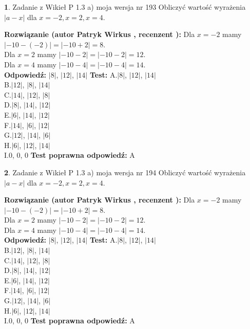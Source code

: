 \documentclass[12pt, a4paper]{article}
\theoremstyle{definition} %
\newtheorem{zad}{}
\newcommand{\zadStart}[1]{\begin{zad}#1\newline}
\newcommand{\zadStop}{\end{zad}}
\newcommand{\rozwStart}[2]{\noindent \textbf{Rozwiązanie (autor #1 , recenzent #2): }\newline}
\newcommand{\rozwStop}{\newline}
\newcommand{\odpStart}{\noindent \textbf{Odpowiedź:}\newline}
\newcommand{\odpStop}{\newline}
\newcommand{\testStart}{\noindent \textbf{Test:}\newline}
\newcommand{\testStop}{\newline}
\newcommand{\kluczStart}{\noindent \textbf{Test poprawna odpowiedź:}\newline}
\newcommand{\kluczStop}{\newline}
\begin{document}
\zadStart{Zadanie z Wikieł P 1.3 a) moja wersja nr 193}
Obliczyć wartość wyrażenia $|a - x|$ dla $x=-2,x=2,x=4$.
\zadStop
\rozwStart{Patryk Wirkus}{}
Dla $x = -2$ mamy $|-10 - (-2)| = |-10 + 2| = 8$.\\
Dla $x = 2$ mamy $|-10 - 2| = |-10 - 2| = 12$.\\
Dla $x = 4$ mamy $|-10 - 4| = |-10 - 4| = 14$.\\
\rozwStop
\odpStart
$|8|$, $|12|$, $|14|$
\odpStop
\testStart
A.$|8|$, $|12|$, $|14|$\\
B.$|12|$, $|8|$, $|14|$\\
C.$|14|$, $|12|$, $|8|$\\
D.$|8|$, $|14|$, $|12|$\\
E.$|6|$, $|14|$, $|12|$\\
F.$|14|$, $|6|$, $|12|$\\
G.$|12|$, $|14|$, $|6|$\\
H.$|6|$, $|12|$, $|14|$\\
I.$0$, $0$, $0$
\testStop
\kluczStart
A
\kluczStop



\zadStart{Zadanie z Wikieł P 1.3 a) moja wersja nr 194}
Obliczyć wartość wyrażenia $|a - x|$ dla $x=-2,x=2,x=4$.
\zadStop
\rozwStart{Patryk Wirkus}{}
Dla $x = -2$ mamy $|-10 - (-2)| = |-10 + 2| = 8$.\\
Dla $x = 2$ mamy $|-10 - 2| = |-10 - 2| = 12$.\\
Dla $x = 4$ mamy $|-10 - 4| = |-10 - 4| = 14$.\\
\rozwStop
\odpStart
$|8|$, $|12|$, $|14|$
\odpStop
\testStart
A.$|8|$, $|12|$, $|14|$\\
B.$|12|$, $|8|$, $|14|$\\
C.$|14|$, $|12|$, $|8|$\\
D.$|8|$, $|14|$, $|12|$\\
E.$|6|$, $|14|$, $|12|$\\
F.$|14|$, $|6|$, $|12|$\\
G.$|12|$, $|14|$, $|6|$\\
H.$|6|$, $|12|$, $|14|$\\
I.$0$, $0$, $0$
\testStop
\kluczStart
A
\kluczStop
\end{document}
